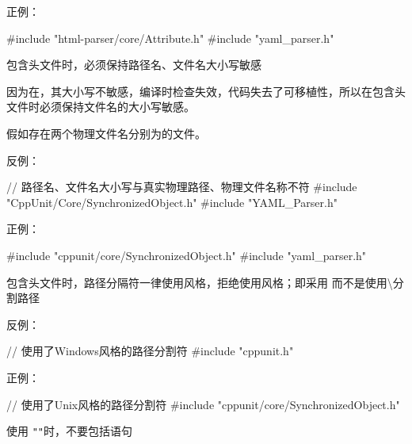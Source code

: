 \begin{content}
正例：
\begin{leftbar}
\begin{c++}[caption={正确的头文件包含}]
#include "html-parser/core/Attribute.h"
#include "yaml_parser.h"
\end{c++}
\end{leftbar}

\begin{regulation}
包含头文件时，必须保持路径名、文件名大小写敏感
\end{regulation}

因为在，其大小写不敏感，编译时检查失效，代码失去了可移植性，所以在包含头文件时必须保持文件名的大小写敏感。

假如存在两个物理文件名分别为的文件。

反例：
\begin{leftbar}
\begin{c++}
// 路径名、文件名大小写与真实物理路径、物理文件名称不符
#include "CppUnit/Core/SynchronizedObject.h"
#include "YAML_Parser.h"
\end{c++}
\end{leftbar}

正例：
\begin{leftbar}
\begin{c++}
#include "cppunit/core/SynchronizedObject.h"
#include "yaml_parser.h"
\end{c++}
\end{leftbar}

\begin{regulation}
包含头文件时，路径分隔符一律使用风格，拒绝使用风格；即采用\code{/}
而不是使用\textbackslash{}分割路径
\end{regulation}

反例：
\begin{leftbar}
\begin{c++}
// 使用了Windows风格的路径分割符
#include "cppunit\core\SynchronizedObject.h"
\end{c++}
\end{leftbar}

正例：
\begin{leftbar}
\begin{c++}
// 使用了Unix风格的路径分割符
#include "cppunit/core/SynchronizedObject.h"
\end{c++}
\end{leftbar}

\begin{regulation}
使用 \texttt{"}\texttt{"}时，不要包括语句
\end{regulation}


\end{content}
